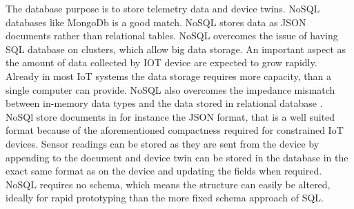 The database purpose is to store telemetry data and device twins. NoSQL databases like MongoDb \cite{mongo} is a good match. NoSQL stores data as JSON documents rather than relational tables. NoSQL overcomes the issue of having SQL database on clusters, which allow big data storage. An important aspect as the amount of data collected by IOT device are expected to grow rapidly. Already in most IoT systems the data storage requires more capacity, than a single computer can provide. NoSQL also overcomes the impedance mismatch between in-memory data types and the data stored in relational database \cite{nosql}. NoSQl store documents in for instance the JSON format, that is a well suited format because of the aforementioned compactness required for constrained IoT devices. Sensor readings can be stored as they are sent from the device by appending to the document and device twin can be stored in the database in the exact same format as on the device and updating the fields when required. NoSQL requires no schema, which means the structure can easily be altered, ideally for rapid prototyping than the more fixed schema approach of SQL.